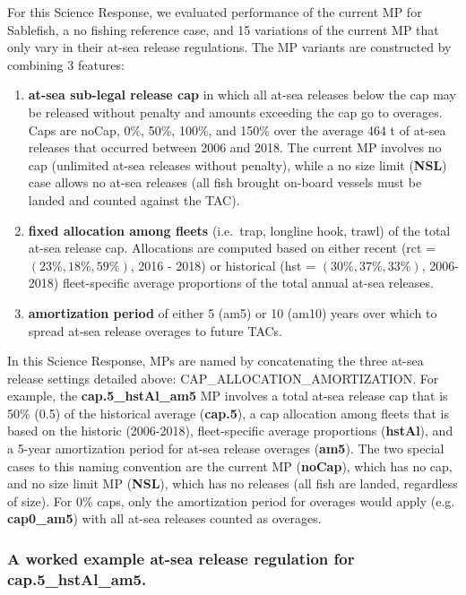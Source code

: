 \documentclass[11pt]{book}
\begin{document}
For this Science Response, we evaluated performance of the current MP for Sablefish, a no fishing reference case, and 15 variations of the current MP that only vary in their at-sea release regulations. The MP variants are constructed by combining 3 features:
\begin{enumerate}
\def\labelenumi{\arabic{enumi}.}

\item
  \textbf{at-sea sub-legal release cap} in which all at-sea releases below the cap may be released without penalty and amounts exceeding the cap go to overages. Caps are noCap, 0\%, 50\%, 100\%, and 150\% over the average 464 t of at-sea releases that occurred between 2006 and 2018. The current MP involves no cap (unlimited at-sea releases without penalty), while a no size limit (\textbf{NSL}) case allows no at-sea releases (all fish brought on-board vessels must be landed and counted against the TAC).
\item
  \textbf{fixed allocation among fleets} (i.e.~trap, longline hook, trawl) of the total at-sea release cap. Allocations are computed based on either recent (rct = \((23\%, 18\%, 59\%)\), 2016 - 2018) or historical (hst = \((30\%, 37\%, 33\%)\), 2006-2018) fleet-specific average proportions of the total annual at-sea releases.
\item
  \textbf{amortization period} of either 5 (am5) or 10 (am10) years over which to spread at-sea release overages to future TACs.
\end{enumerate}
In this Science Response, MPs are named by concatenating the three at-sea release settings detailed above: CAP\_ALLOCATION\_AMORTIZATION. For example, the \textbf{cap.5\_hstAl\_am5} MP involves a total at-sea release cap that is 50\% (0.5) of the historical average (\textbf{cap.5}), a cap allocation among fleets that is based on the historic (2006-2018), fleet-specific average proportions (\textbf{hstAl}), and a 5-year amortization period for at-sea release overages (\textbf{am5}). The two special cases to this naming convention are the current MP (\textbf{noCap}), which has no cap, and no size limit MP (\textbf{NSL}), which has no releases (all fish are landed, regardless of size). For 0\% caps, only the amortization period for overages would apply (e.g. \textbf{cap0\_am5}) with all at-sea releases counted as overages.

\hypertarget{a-worked-example-at-sea-release-regulation-for-cap.5_hstal_am5.}{%
\subsubsection{\texorpdfstring{A worked example at-sea release regulation for \textbf{cap.5\_hstAl\_am5}.}{A worked example at-sea release regulation for cap.5\_hstAl\_am5.}}\label{a-worked-example-at-sea-release-regulation-for-cap.5_hstal_am5.}}
\end{document}
